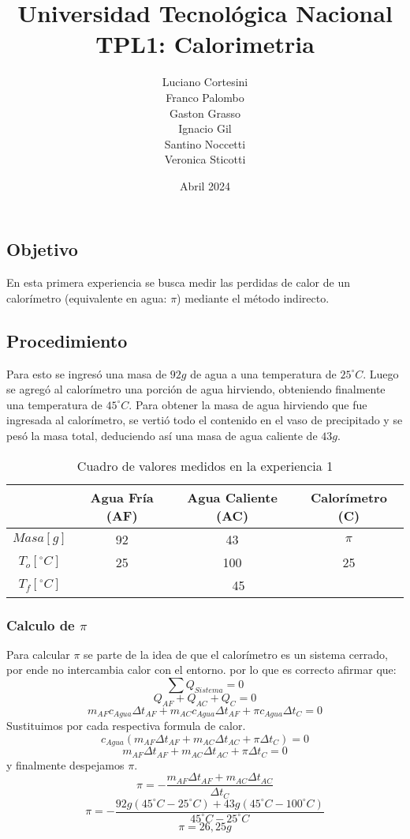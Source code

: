 \documentclass[12pt]{report}
\title{Universidad Tecnológica Nacional\\TPL1: Calorimetria}
\author{
Luciano Cortesini\\
Franco Palombo\\
Gaston Grasso\\
Ignacio Gil\\
Santino Noccetti\\
Veronica Sticotti
}
\date{Abril 2024}
\begin{document}
\maketitle

\chapter{}
\section{Objetivo}
En esta primera experiencia se busca medir las perdidas de calor de un calorímetro (equivalente en agua: $\pi$) mediante el método indirecto. 

\section{Procedimiento}
Para esto se ingresó una masa de $92 g$ de agua a una temperatura de $25^\circ C$.
Luego se agregó al calorímetro una porción de agua hirviendo, obteniendo finalmente una temperatura de  $45^\circ C$. 
Para obtener la masa de agua hirviendo que fue ingresada al calorímetro, se vertió todo el contenido en el vaso de precipitado y se pesó la masa total, deduciendo así una masa de agua caliente de $43g$.
\begin{table}[htbp]
    \centering
    \begin{tabular}{|c|c|c|c|}
    \hline
    & Agua Fría (AF) & Agua Caliente (AC) & Calorímetro (C)\\
    \hline
    $Masa[g]$ & 92 & 43 & $\pi$ \\
    \hline
   $T_o[^\circ C]$ & 25 & 100 & 25\\
    \hline
     $T_f[^\circ C]$ & \multicolumn{3}{|c|}{45}\\
    \hline
    \end{tabular}
    \caption{Cuadro de valores medidos en la experiencia 1}
    \label{tab:datos experiencia 1}
\end{table}
\subsection{Calculo de $\pi$}
Para calcular $\pi$ se parte de la idea de que el calorímetro es un sistema cerrado, por ende no intercambia calor con el entorno. por lo que es correcto afirmar que:
$$\sum Q_{Sistema}= 0$$
$$Q_{AF} + Q_{AC} + Q_{C} = 0$$
$$m_{AF} c_{Agua} {\Delta t}_{AF} + m_{AC} c_{Agua} {\Delta t}_{AF} + \pi c_{Agua} {\Delta t}_{C} = 0$$
\hspace{1cm} Sustituimos por cada respectiva formula de calor.
$$c_{Agua}(m_{AF}  {\Delta t}_{AF} + m_{AC}  {\Delta t}_{AC} + \pi {\Delta t}_C) = 0$$
$$m_{AF}  {\Delta t}_{AF} + m_{AC}  {\Delta t}_{AC} + \pi {\Delta t}_C= 0$$
\hspace{1cm} y finalmente despejamos $\pi$.
$$\pi =-\frac{m_{AF}  {\Delta t}_{AF} + m_{AC}  {\Delta t}_{AC}}{{\Delta t}_C}$$
$$\pi =-\frac{92g(45^\circ C-25^\circ C)+ 43g (45^\circ C-100^\circ C)}{45^\circ C-25^\circ C}$$
$$\pi = 26,25g$$
\end{document}

